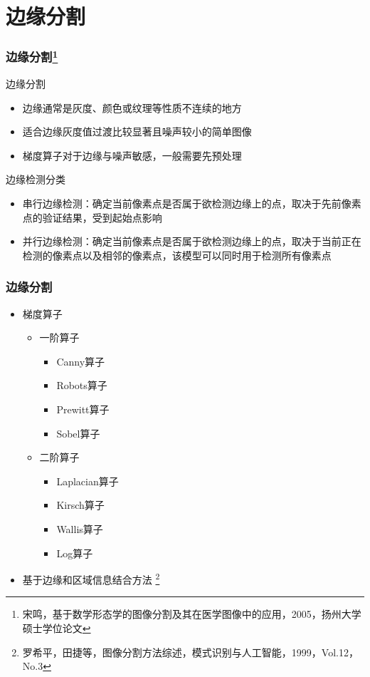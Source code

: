 \documentclass[notheorems,mathserif,table,compress]{beamer}  %
\begin{document}
\section{边缘分割}
\begin{frame}
  \frametitle{边缘分割\footnote{宋鸣，基于数学形态学的图像分割及其在医学图像中的应用，2005，扬州大学硕士学位论文}}
   边缘分割
   \begin{itemize}
   \item 边缘通常是灰度、颜色或纹理等性质不连续的地方
   \item 适合边缘灰度值过渡比较显著且噪声较小的简单图像
   \item 梯度算子对于边缘与噪声敏感，一般需要先预处理
   \end{itemize}
   边缘检测分类
   \begin{itemize}
   \item 串行边缘检测：确定当前像素点是否属于欲检测边缘上的点，取决于先前像素点的验证结果，受到起始点影响
   \item 并行边缘检测：确定当前像素点是否属于欲检测边缘上的点，取决于当前正在检测的像素点以及相邻的像素点，该模型可以同时用于检测所有像素点
   \end{itemize}
\end{frame}

\begin{frame}
   \frametitle{边缘分割}
   \begin{itemize}
   \item 梯度算子
         \begin{itemize}
         \item 一阶算子
               \begin{itemize}
               \item Canny算子
               \item Robots算子
               \item Prewitt算子
               \item Sobel算子
               \end{itemize}
         \item 二阶算子
               \begin{itemize}
               \item Laplacian算子
               \item Kirsch算子
               \item Wallis算子
               \item Log算子
               \end{itemize}
         \end{itemize}
   \item 基于边缘和区域信息结合方法 \footnote{罗希平，田捷等，图像分割方法综述，模式识别与人工智能，1999，Vol.12，No.3}       
   \end{itemize}
\end{frame}
\end{document}

